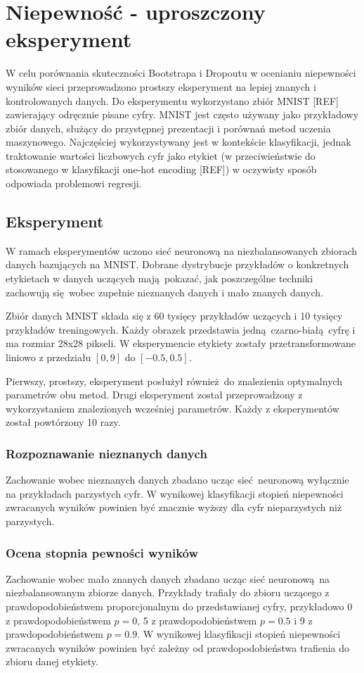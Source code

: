 \section{Niepewność - uproszczony eksperyment}
W celu porównania skuteczności Bootstrapa i Dropoutu w ocenianiu niepewności wyników sieci przeprowadzono prostszy eksperyment na lepiej znanych i kontrolowanych danych. Do eksperymentu wykorzystano zbiór MNIST [REF] zawierający odręcznie pisane cyfry. MNIST jest często używany jako przykładowy zbiór danych, służący do przystępnej prezentacji i porównań metod uczenia maszynowego. Najczęściej wykorzystywany jest w kontekście klasyfikacji, jednak traktowanie wartości liczbowych cyfr jako etykiet (w przeciwieństwie do stosowanego w klasyfikacji one-hot encoding [REF]) w oczywisty sposób odpowiada problemowi regresji.    

\subsection{Eksperyment}
W ramach eksperymentów uczono sieć neuronową na niezbalansowanych zbiorach danych bazujących na MNIST. Dobrane dystrybucje przykładów o konkretnych etykietach w danych uczących mają pokazać, jak poszczególne techniki zachowują się wobec zupełnie nieznanych danych i mało znanych danych.

Zbiór danych MNIST składa się z 60 tysięcy przykładów uczących i 10 tysięcy przykładów treningowych. Każdy obrazek przedstawia jedną czarno-białą cyfrę i ma rozmiar 28x28 pikseli. W eksperymencie etykiety zostały przetransformowane liniowo z przedziału $[0,9]$ do $[-0.5,0.5]$.

Pierwszy, prostszy, eksperyment posłużył również do znalezienia optymalnych parametrów obu metod. Drugi eksperyment został przeprowadzony z wykorzystaniem znalezionych wcześniej parametrów. Każdy z eksperymentów został powtórzony 10 razy.

\subsubsection{Rozpoznawanie nieznanych danych}
Zachowanie wobec nieznanych danych zbadano ucząc sieć neuronową wyłącznie na przykładach parzystych cyfr. W wynikowej klasyfikacji stopień niepewności zwracanych wyników powinien być znacznie wyższy dla cyfr nieparzystych niż parzystych.


\subsubsection{Ocena stopnia pewności wyników}
Zachowanie wobec mało znanych danych zbadano ucząc sieć neuronową na niezbalansowanym zbiorze danych. Przykłady trafiały do zbioru uczącego z prawdopodobieństwem proporcjonalnym do przedstawianej cyfry, przykładowo 0 z prawdopodobieństwem $p=0$, 5 z prawdopodobieństwem $p=0.5$ i 9 z prawdopodobieństwem $p=0.9$. W wynikowej klasyfikacji stopień niepewności zwracanych wyników powinien być zależny od prawdopodobieństwa trafienia do zbioru danej etykiety.

